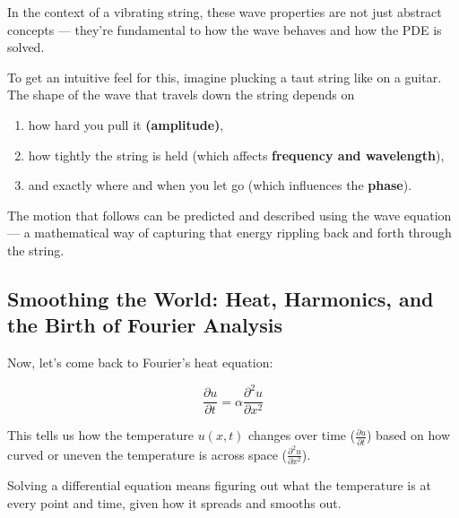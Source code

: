 \vspace{1.5em}


In the context of a vibrating string, these wave properties are not just abstract concepts — they’re fundamental to how the wave behaves and how the PDE is solved.

To get an intuitive feel for this, imagine plucking a taut string like on a guitar. The shape of the wave that travels down the string depends on 

\begin{enumerate}
	\item how hard you pull it \textbf{(amplitude)}, 
	\item how tightly the string is held (which affects \textbf{frequency and wavelength}), 
	\item and exactly where and when you let go (which influences the \textbf{phase}). 
\end{enumerate}
	
The motion that follows can be predicted and described using the wave equation — a mathematical way of capturing that energy rippling back and forth through the string.



\subsection{Smoothing the World: Heat, Harmonics, and the Birth of Fourier Analysis}

Now, let's come back to Fourier's heat equation:

\[
\frac{\partial u}{\partial t} = \alpha \frac{\partial^2 u}{\partial x^2}
\]


This tells us how the temperature \( u(x, t) \) changes over time (\( \frac{\partial u}{\partial t} \)) based on how curved or uneven the temperature is across space (\( \frac{\partial^2 u}{\partial x^2} \)). 

Solving a differential equation means figuring out what the temperature is at every point and time, given how it spreads and smooths out.

